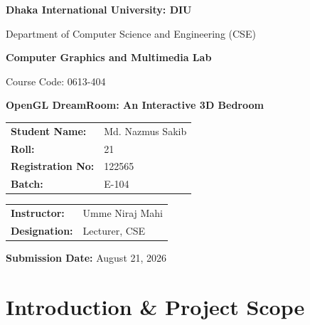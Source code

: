 \documentclass[12pt,a4paper]{report}
\begin{document}
\begin{titlepage}
  \centering
  \vspace*{2cm}
  {\Huge\bfseries Dhaka International University: DIU \par}
  \vspace{1.0cm}
  {\Large Department of Computer Science and Engineering (CSE)\par}
  \vspace{1.5cm}
  {\huge\bfseries Computer Graphics and Multimedia Lab \par}
  \vspace{0.5cm}
  {\Large Course Code: 0613-404 \par}
  \vspace{2.0cm}
  {\LARGE \textbf{OpenGL DreamRoom: An Interactive 3D Bedroom}\par}
  \vspace{3.0cm}

  \begin{tabular}{ll}
    \textbf{Student Name:} & Md. Nazmus Sakib \\
    \textbf{Roll:} & 21 \\
    \textbf{Registration No:} & 122565 \\
    \textbf{Batch:} & E-104 \\
  \end{tabular}
  \vspace{1.5cm}

  \begin{tabular}{ll}
    \textbf{Instructor:} & Umme Niraj Mahi \\
    \textbf{Designation:} & Lecturer, CSE \\
  \end{tabular}
  \vfill

  \textbf{Submission Date:} August 21, 2026
  \vspace{1.5cm}

  \vfill
\end{titlepage}

\cleardoublepage
\thispagestyle{empty}
\tableofcontents
\listoffigures
\listoftables
\clearpage

\setcounter{page}{1}

\chapter{Introduction \& Project Scope}
\end{document}
